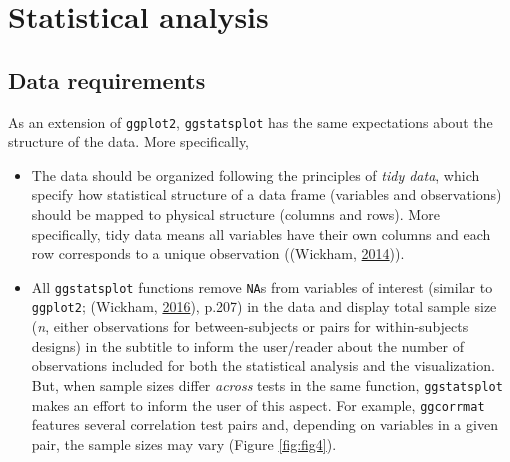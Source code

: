 \documentclass[]{article}
\begin{document}
\hypertarget{statistical-analysis}{%
\section{Statistical analysis}\label{statistical-analysis}}

\hypertarget{data-requirements}{%
\subsection{Data requirements}\label{data-requirements}}

As an extension of \texttt{ggplot2}, \texttt{ggstatsplot} has the same expectations about the
structure of the data. More specifically,

\begin{itemize}
\item
  The data should be organized following the principles of \emph{tidy data}, which
  specify how statistical structure of a data frame (variables and
  observations) should be mapped to physical structure (columns and rows).
  More specifically, tidy data means all variables have their own columns and
  each row corresponds to a unique observation ((Wickham, \protect\hyperlink{ref-wickhamTidyData2014}{2014})).
\item
  All \texttt{ggstatsplot} functions remove \texttt{NA}s from variables of interest (similar
  to \texttt{ggplot2}; (Wickham, \protect\hyperlink{ref-wickhamGgplot2ElegantGraphics2016}{2016}), p.207) in the data and
  display total sample size (\emph{n}, either observations for between-subjects or
  pairs for within-subjects designs) in the subtitle to inform the user/reader
  about the number of observations included for both the statistical analysis
  and the visualization. But, when sample sizes differ \emph{across} tests in the
  same function, \texttt{ggstatsplot} makes an effort to inform the user of this
  aspect. For example, \texttt{ggcorrmat} features several correlation test pairs
  and, depending on variables in a given pair, the sample sizes may vary
  (Figure \ref{fig:fig4}).
\end{itemize}
\end{document}
